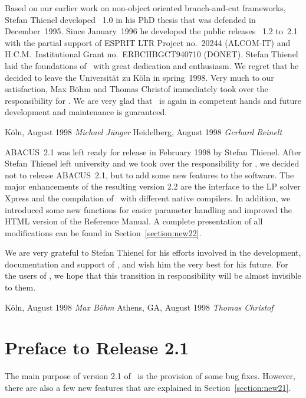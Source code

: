 Based on our earlier work on non-object oriented branch-and-cut
frameworks, Stefan Thienel developed \ABACUS~1.0 in his PhD thesis that
was defended in December~1995. Since January~1996 he developed the
public releases \ABACUS~1.2 to~2.1 with the partial support of 
ESPRIT LTR Project no.\ 20244 (ALCOM-IT) and
H.C.M.\ Institutional Grant no.\ ERBCHBGCT940710 (DONET).
Stefan Thienel laid the foundations of \ABACUS\ with great dedication
and enthusiasm. We regret that he decided to leave the Universit\"at zu
K\"oln in spring~1998. Very much to our satisfaction, Max B\"ohm and
Thomas Christof immediately took over the responsibility for
\ABACUS. We are very glad that \ABACUS\ is again in competent hands and future
development and maintenance is guaranteed.

\bigskip
\bigskip\noindent
{K\"oln, August 1998 \hfill {\it Michael J\"unger}}\newline
\smallskip
{Heidelberg, August 1998 \hfill {\it Gerhard Reinelt}}


\medskip

ABACUS~2.1 was left ready for release in February 1998 by Stefan Thienel.
After Stefan Thienel left university and we
took over the responsibility for \ABACUS, we decided
not to release ABACUS~2.1, but to add some new features to the software.
The major enhancements of the resulting version 2.2 are
the interface to the LP solver Xpress
and the compilation of \ABACUS\ with different native compilers. 
In addition, we introduced some new functions for easier parameter
handling and improved the HTML version of the Reference Manual.
A complete presentation of all modifications can be found in
Section~\ref{section:new22}.

We are very grateful to Stefan Thienel for his efforts involved in
the development, documentation and support of \ABACUS, and wish him
the very best for his future. For the users of \ABACUS, we hope that
this transition in responsibility will be almost invisible to them.


\bigskip
\bigskip\noindent
{K\"oln, August 1998 \hfill {\it Max B\"ohm}}\newline
\smallskip
{Athens, GA, August 1998 \hfill {\it Thomas Christof}}



\section*{Preface to Release 2.1}


The main purpose of version 2.1 of \ABACUS\ is the provision of some
bug fixes. However, there are also a few new features that are
explained in Section~\ref{section:new21}.


